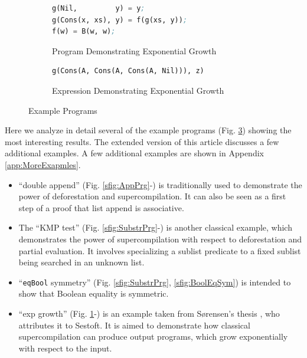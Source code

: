 \documentclass[submission,copyright,creativecommons]{eptcs}
\begin{document}
\begin{figure}
\begin{subfigure}[b]{\linewidth}
\begin{lstlisting}[language=Lisp,keywords={}]
g(Nil,         y) = y;
g(Cons(x, xs), y) = f(g(xs, y));
f(w) = B(w, w);
\end{lstlisting}
\caption{Program Demonstrating Exponential Growth}
\label{sfig:ExpGrowthPrg}
\end{subfigure}

\begin{subfigure}[b]{\linewidth}
\begin{lstlisting}[language=Lisp,keywords={}]
g(Cons(A, Cons(A, Cons(A, Nil))), z)
\end{lstlisting}
\caption{Expression Demonstrating Exponential Growth}
\label{sfig:ExpGrowth}
\end{subfigure}

\caption{Example Programs}\label{fig:Examples}
\end{figure}

Here we analyze in detail several of the example programs (Fig. \ref{fig:Examples}) showing the most interesting results.
\ifVptVer
The extended version of this article \cite{krustev2020controlling} discusses a few additional examples.
\else
A few additional examples are shown in Appendix \ref{app:MoreExapmles}.
\fi
\begin{itemize}
  \item ``double append'' (Fig. \ref{sfig:AppPrg}-) is traditionally used to 
    demonstrate the power of deforestation and supercompilation.
    It can also be seen as a first step of a proof that list append is associative.
  \item The ``KMP test'' (Fig. \ref{sfig:SubstrPrg}-) is another classical example, 
    which demonstrates the power of supercompilation with respect to deforestation and partial evaluation.
    It involves specializing a sublist predicate to a fixed sublist being
    searched in an unknown list.
  \item ``\verb|eqBool| symmetry'' (Fig. \ref{sfig:SubstrPrg}, \ref{sfig:BoolEqSym}) is intended
    to show that Boolean equality is symmetric.
  \item ``exp growth'' (Fig. \ref{sfig:ExpGrowthPrg}-) is an example taken 
    from S{\o}rensen's thesis \cite[Example 11.4.1]{Sorensen1994TurchinSupercompiler}, who attributes it to Sestoft.
    It is aimed to demonstrate how classical supercompilation can produce output programs,
    which grow exponentially with respect to the input.
\end{itemize}
\end{document}
